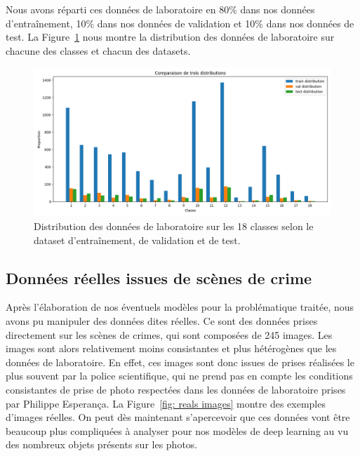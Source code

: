 Nous avons réparti ces données de laboratoire en 80\% dans nos données d'entraînement, 10\% dans nos données de validation et 10\% dans nos données de test. La Figure~\ref{fig:distribution labo} nous montre la distribution des données de laboratoire sur chacune des classes et chacun des datasets.

\begin{figure}[ht]
    \centering
    \includegraphics[width=0.8\linewidth]{../asset/distribution_train_val_test.png}
    \caption{Distribution des données de laboratoire sur les 18 classes selon le dataset d'entraînement, de validation et de test.}
    \label{fig:distribution labo}
\end{figure}

\subsection{Données réelles issues de scènes de crime}
Après l'élaboration de nos éventuels modèles pour la problématique traitée, nous avons pu manipuler des données dites réelles. Ce sont des données prises directement sur les scènes de crimes, qui sont composées de 245 images. Les images sont alors relativement moins consistantes et plus hétérogènes que les données de laboratoire. En effet, ces images sont donc issues de prises réalisées le plus souvent par la police scientifique, qui ne prend pas en compte les conditions consistantes de prise de photo respectées dans les données de laboratoire prises par Philippe Esperança. La Figure~\ref{fig: reals images} montre des exemples d'images réelles. On peut dès maintenant s'apercevoir que ces données vont être beaucoup plus compliquées à analyser pour nos modèles de deep learning au vu des nombreux objets présents sur les photos.

